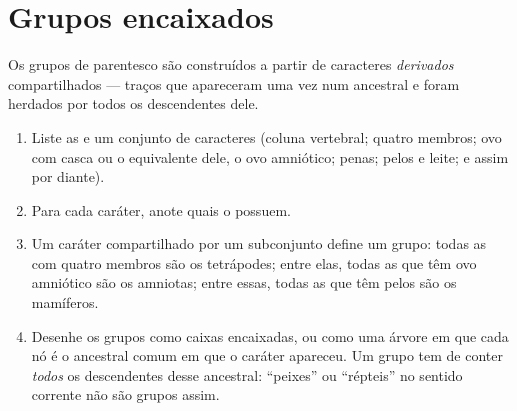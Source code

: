 \section{Grupos encaixados}

\begin{method}\label{met:g10:common-ancestry:grouping}
Os grupos de parentesco são construídos a partir de caracteres
\emph{derivados} compartilhados --- traços que apareceram uma vez num
ancestral e foram herdados por todos os descendentes dele.
\begin{enumerate}
  \item Liste as  e um conjunto de caracteres (coluna
        vertebral; quatro membros; ovo com casca ou o equivalente
        dele, o ovo amniótico; penas; pelos e leite; e assim por
        diante).
  \item Para cada caráter, anote quais  o possuem.
  \item Um caráter compartilhado por um subconjunto define um grupo:
        todas as  com quatro membros são os tetrápodes; entre
        elas, todas as que têm ovo amniótico são os amniotas; entre
        essas, todas as que têm pelos são os mamíferos.
  \item Desenhe os grupos como caixas encaixadas, ou como uma árvore
        em que cada nó é o ancestral comum em que o caráter apareceu.
        Um grupo tem de conter \emph{todos} os descendentes desse
        ancestral: ``peixes'' ou ``répteis'' no sentido corrente não
        são grupos assim.
\end{enumerate}
\end{method}

